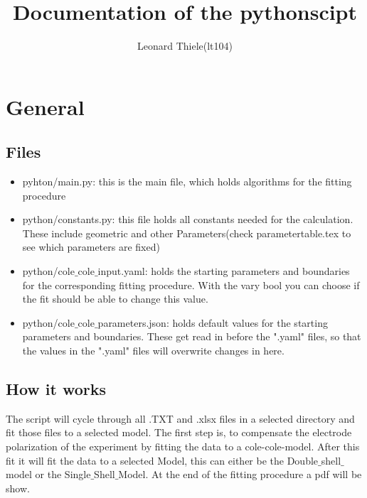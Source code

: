 \documentclass[10pt,a4paper]{article}
\title{Documentation of the pythonscipt}
\author{Leonard Thiele(lt104)}
\renewcommand{\*}{\cdot}
\begin{document}
\section{General}{
\subsection{Files}{
\begin{itemize}
\item pyhton/main.py: this is the main file, which holds algorithms for the fitting procedure
\item python/constants.py: this file holds all constants needed for the calculation. These include geometric and other Parameters(check parametertable.tex to see which parameters are fixed)
\item python/cole$\_$cole$\_$input.yaml: holds the starting parameters and boundaries for the corresponding fitting procedure. With the vary bool you can choose if the fit should be able to change this value. 
\item python/cole$\_$cole$\_$parameters.json: holds default values for the starting parameters and boundaries. These get read in before the ".yaml" files, so that the values in the ".yaml" files will overwrite changes in here. 
\end{itemize}
}
\subsection{How it works}{
The script will cycle through all .TXT and .xlsx files in a selected directory and fit those files to a selected model. The first step is, to compensate the electrode polarization of the experiment by fitting the data to a cole-cole-model. After this fit it will fit the data to a selected Model, this can either be the Double$\_$shell$\_$model or the Single$\_$Shell$\_$Model. At the end of the fitting procedure a pdf will be show.   
}%
}
\end{document}
